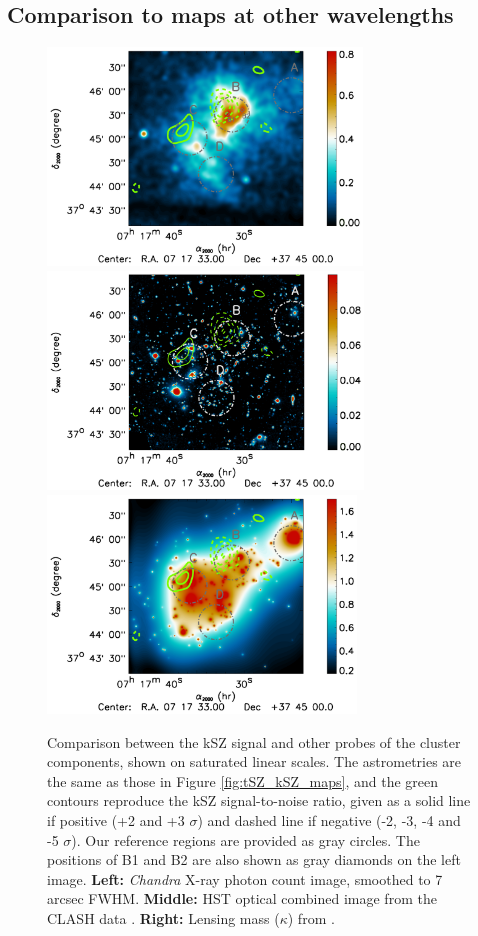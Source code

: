 \documentclass[twocolumn,traditabstract]{aa}
\begin{document}
\subsection{Comparison to maps at other wavelengths}\label{sec:Qualitative_comparison_to_other_wavelengths}
\begin{figure}[h]
\centering
\includegraphics[trim=4.6cm 2.3cm 3cm 0cm, clip=true,height=5.8cm]{Figure/MACSJ0717_multiL2.pdf}
\includegraphics[trim=4.6cm 2.3cm 3cm 0cm, clip=true,height=5.8cm]{Figure/MACSJ0717_multiL3.pdf}
\includegraphics[trim=4.6cm 2.3cm 3cm 0cm, clip=true,height=5.8cm]{Figure/MACSJ0717_multiL1.pdf}
\caption{\footnotesize{Comparison between the kSZ signal and other probes of the cluster components, shown on saturated linear scales. The astrometries are the same as those in Figure  \ref{fig:tSZ_kSZ_maps}, and the green contours reproduce the kSZ signal-to-noise ratio, given as a solid line if positive (+2 and +3 $\sigma$) and dashed line if negative (-2, -3, -4  and -5 $\sigma$). Our reference regions are provided as gray circles. The positions of B1 and B2 are also shown as gray diamonds on the left image. {\bf Left:} \textit{Chandra} X-ray photon count image, smoothed to 7 arcsec FWHM. {\bf Middle:} HST optical combined image from the CLASH data \citep{Postman2012}. {\bf Right:} Lensing mass ($\kappa$) from \cite{Zitrin2011}.}}
\label{fig:tSZ_kSZ_multiL}
\end{figure}
\end{document}
